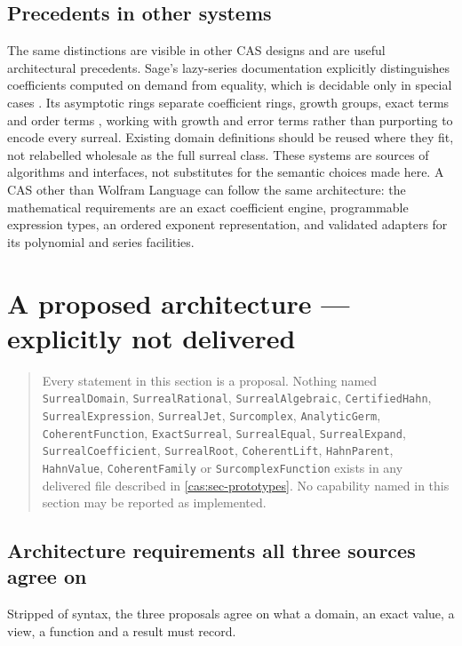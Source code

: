\documentclass[11pt,letterpaper]{article}
\numberwithin{equation}{section}
\theoremstyle{definition}
\theoremstyle{remark}
\begin{document}
\subsection{Precedents in other systems}
\label{cas:sub-sage}
The same distinctions are visible in other CAS designs and are useful
architectural precedents. Sage's lazy-series documentation explicitly
distinguishes coefficients computed on demand from equality, which is decidable
only in special cases \cite{cas:SageLazy}. Its asymptotic rings separate
coefficient rings, growth groups, exact terms and order terms
\cite{cas:SageAsymptotic}, working with growth and error terms rather than
purporting to encode every surreal. Existing domain definitions should be reused
where they fit, not relabelled wholesale as the full surreal class. These
systems are sources of algorithms and interfaces, not substitutes for the
semantic choices made here. A CAS other than Wolfram Language can follow the
same architecture: the mathematical requirements are an exact coefficient
engine, programmable expression types, an ordered exponent representation, and
validated adapters for its polynomial and series facilities.

\section{A proposed architecture --- explicitly not delivered}
\label{cas:sec-architecture}

\begin{quote}\small\itshape\raggedright
Every statement in this section is a proposal. Nothing named
\texttt{SurrealDomain}, \texttt{SurrealRational}, \texttt{SurrealAlgebraic},
\texttt{CertifiedHahn}, \texttt{SurrealExpression}, \texttt{SurrealJet},
\texttt{Surcomplex}, \texttt{AnalyticGerm}, \texttt{CoherentFunction},
\texttt{ExactSurreal}, \texttt{SurrealEqual}, \texttt{SurrealExpand},
\texttt{SurrealCoefficient}, \texttt{SurrealRoot}, \texttt{CoherentLift},
\texttt{HahnParent}, \texttt{HahnValue}, \texttt{CoherentFamily} or
\texttt{SurcomplexFunction} exists in any delivered file described in
\cref{cas:sec-prototypes}. No capability named in this section may be reported
as implemented.
\end{quote}

\subsection{Architecture requirements all three sources agree on}
\label{cas:sub-requirements}
Stripped of syntax, the three proposals agree on what a domain, an exact value,
a view, a function and a result must record.
\end{document}
